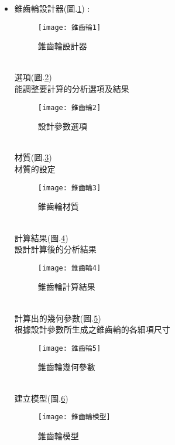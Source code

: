 \begin{itemize}
	\item 錐齒輪設計器(圖.\ref{2.25}) :\\
		\begin{figure}[hbt!]
		\begin{center}
		\texttt{[image: 錐齒輪1]}
		\caption{\Large 錐齒輪設計器}\label{2.25}
		\end{center}
		\end{figure}
		\\
		選項(圖.\ref{2.26}) \\
		\qquad 能調整要計算的分析選項及結果\\
		\begin{figure}[hbt!]
		\begin{center}
		\texttt{[image: 錐齒輪2]}
		\caption{\Large 設計參數選項}\label{2.26}
		\end{center}
		\end{figure}
		\\
		材質(圖.\ref{2.27}) \\
		材質的設定\\
		\begin{figure}[hbt!]
		\begin{center}
		\texttt{[image: 錐齒輪3]}
		\caption{\Large 錐齒輪材質}\label{2.27}
		\end{center}
		\end{figure}
		\\
		計算結果(圖.\ref{2.28}) \\
		\qquad 設計計算後的分析結果\\
		\begin{figure}[hbt!]
		\begin{center}
		\texttt{[image: 錐齒輪4]}
		\caption{\Large 錐齒輪計算結果}\label{2.28}
		\end{center}
		\end{figure}
		\\
		計算出的幾何參數(圖.\ref{2.29}) \\
		\qquad 根據設計參數所生成之錐齒輪的各細項尺寸\\
		\begin{figure}[hbt!]
		\begin{center}
		\texttt{[image: 錐齒輪5]}
		\caption{\Large 錐齒輪幾何參數}\label{2.29}
		\end{center}
		\end{figure}
		\\
		建立模型(圖.\ref{2.228}) \\
		\begin{figure}[hbt!]
		\begin{center}
		\texttt{[image: 錐齒輪模型]}
		\caption{\Large 錐齒輪模型}\label{2.228}
		\end{center}
		\end{figure}
		\\
	

\end{itemize}
